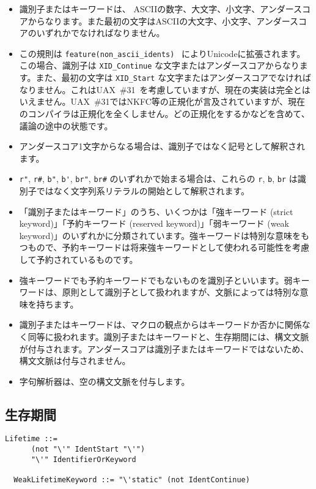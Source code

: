 \documentclass[dvipdfmx,uplatex,papersize,a4paper,10pt]{jsbook}
\theoremstyle{definition}
\begin{document}
\begin{itemize}
  \item 識別子またはキーワードは、 ASCIIの数字、大文字、小文字、アンダースコアからなります。また最初の文字はASCIIの大文字、小文字、アンダースコアのいずれかでなければなりません。
  \item この規則は \verb|feature(non_ascii_idents)|~\cite{RustIssue28979} によりUnicodeに拡張されます。この場合、識別子は \verb|XID_Continue| な文字またはアンダースコアからなります。また、最初の文字は \verb|XID_Start| な文字またはアンダースコアでなければなりません。これはUAX~\#31~\cite{UAX31-25}を考慮していますが、現在の実装は完全とはいえません。UAX~\#31ではNKFC等の正規化が言及されていますが、現在のコンパイラは正規化を全くしません。どの正規化をするかなどを含めて、議論の途中の状態です。
  \item アンダースコア1文字からなる場合は、識別子ではなく記号として解釈されます。
  \item \verb|r"|, \verb|r#|, \verb|b"|, \verb|b'|, \verb|br"|, \verb|br#| のいずれかで始まる場合は、これらの \verb|r|, \verb|b|, \verb|br| は識別子ではなく文字列系リテラルの開始として解釈されます。
  \item 「識別子またはキーワード」のうち、いくつかは「強キーワード (strict keyword)」「予約キーワード (reserved keyword)」「弱キーワード (weak keyword)」のいずれかに分類されています。強キーワードは特別な意味をもつもので、予約キーワードは将来強キーワードとして使われる可能性を考慮して予約されているものです。
  \item 強キーワードでも予約キーワードでもないものを識別子といいます。弱キーワードは、原則として識別子として扱われますが、文脈によっては特別な意味を持ちます。
  \item 識別子またはキーワードは、マクロの観点からはキーワードか否かに関係なく同等に扱われます。識別子またはキーワードと、生存期間には、構文文脈が付与されます。アンダースコアは識別子またはキーワードではないため、構文文脈は付与されません。
  \item 字句解析器は、空の構文文脈を付与します。
\end{itemize}

\subsection{生存期間}

\begin{lstlisting}[language=BNFLike, gobble=2]
  Lifetime ::=
      (not "\'" IdentStart "\'")
      "\'" IdentifierOrKeyword

  WeakLifetimeKeyword ::= "\'static" (not IdentContinue)
\end{lstlisting}
\end{document}
